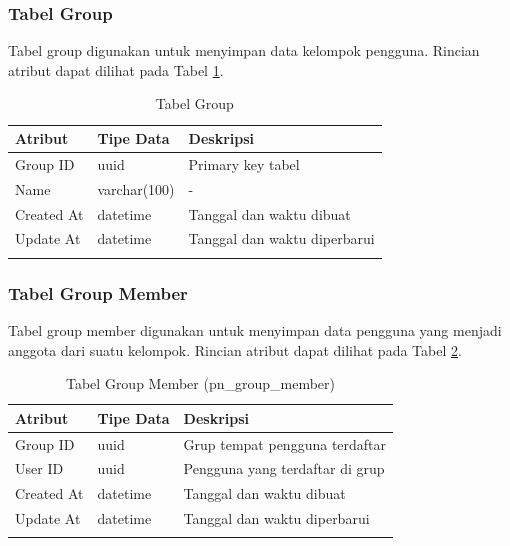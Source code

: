 \subsubsection{Tabel Group}
\par Tabel group digunakan untuk menyimpan data kelompok pengguna. Rincian atribut dapat dilihat pada Tabel \ref{tabel_group}.
\begin{longtable}{|p{2cm}|p{2.5cm}|p{4.5cm}|}
    \hline
    \textbf{Atribut} & \textbf{Tipe Data} & \textbf{Deskripsi} \\ \hline
    Group ID & uuid & Primary key tabel \\ \hline
    Name & varchar(100) & - \\ \hline
    Created At & datetime & Tanggal dan waktu dibuat \\ \hline
    Update At & datetime & Tanggal dan waktu diperbarui \\ \hline
    \caption{Tabel Group}
    \label{tabel_group}
\end{longtable}

\subsubsection{Tabel Group Member}
\par Tabel group member digunakan untuk menyimpan data pengguna yang menjadi anggota dari suatu kelompok. Rincian atribut dapat dilihat pada Tabel \ref{tabel_group_member}.
\begin{longtable}{|p{2cm}|p{2.5cm}|p{4.5cm}|}
    \hline
    \textbf{Atribut} & \textbf{Tipe Data} & \textbf{Deskripsi} \\ \hline
    Group ID & uuid & Grup tempat pengguna terdaftar \\ \hline
    User ID & uuid & Pengguna yang terdaftar di grup \\ \hline
    Created At & datetime & Tanggal dan waktu dibuat \\ \hline
    Update At & datetime & Tanggal dan waktu diperbarui \\ \hline
    \caption{Tabel Group Member (pn\_group\_member)}
    \label{tabel_group_member}
\end{longtable}

